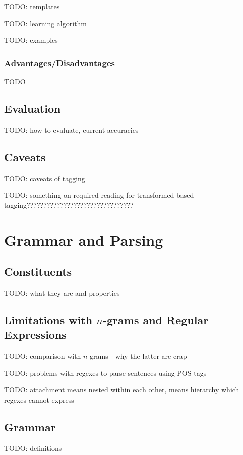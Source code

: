\documentclass{article}
\begin{document}
TODO: templates

TODO: learning algorithm

TODO: examples

\subsubsection{Advantages/Disadvantages}

TODO

\subsection{Evaluation}

TODO: how to evaluate, current accuracies

\subsection{Caveats}

TODO: caveats of tagging


TODO: something on required reading for transformed-based tagging????????????????????????????????

\section{Grammar and Parsing}

\subsection{Constituents}

TODO: what they are and properties

\subsection{Limitations with $n$-grams and Regular Expressions}

TODO: comparison with $n$-grams - why the latter are crap

TODO: problems with regexes to parse sentences using POS tags

TODO: attachment means nested within each other, means hierarchy which regexes cannot express

\subsection{Grammar}

TODO: definitions
\end{document}
